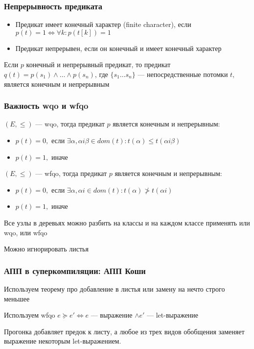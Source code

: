 \documentclass{beamer}
\def\iff{\Leftrightarrow}
\begin{document}
\begin{frame}[fragile]
  \transwipe[direction=90]
  \frametitle{Непрерывность предиката}

  \begin{itemize}
    \item Предикат имеет конечный характер (finite character), если $p(t) = 1 \iff \forall k : p(t[k]) = 1$
    \item Предикат непрерывен, если он конечный и имеет конечный характер 
  \end{itemize}

\vfill
  
  Если $p$ конечный и непрерывный предикат, то предикат $q(t) = p(s_1) \wedge \dots \wedge p(s_n)$, где $\{ s_1 \dots s_n \}$ --- непосредственные потомки $t$, является конечным и непрерывным 
\end{frame}

\begin{frame}[fragile]
  \transwipe[direction=90]
  \frametitle{Важность wqo и wfqo}
$(E, \leq)$ --- wqo, тогда предикат $p$ является конечным и непрерывным:

\begin{itemize}
  \item $p(t) = 0,$ если  $\exists \alpha, \alpha i \beta \in dom(t): t(\alpha) \leq t(\alpha i \beta)$
  \item $p(t) = 1,$ иначе
\end{itemize}

\vfill 

$(E, \leq)$ --- wfqo, тогда предикат $p$ является конечным и непрерывным:

\begin{itemize}
  \item $p(t) = 0,$ если  $\exists \alpha, \alpha i \in dom(t): t(\alpha) \ngtr t(\alpha i)$
  \item $p(t) = 1,$ иначе
\end{itemize}

\vfill 

Все узлы в деревьях можно разбить на классы и на каждом классе применять или wqo, или wfqo 

\vfill 

Можно игнорировать листья 

\end{frame}

\begin{frame}[fragile]
  \transwipe[direction=90]
  \frametitle{АПП в суперкомпиляции: АПП Коши}

  Используем теорему про добавление в листья или замену на нечто строго меньшее

  \vfill 

  Используем wfqo $e \succcurlyeq e' \iff e$ --- выражение $\wedge e'$ --- let-выражение 

  \vfill 

  Прогонка добавляет предок к листу, а любое из трех видов обобщения заменяет выражение некоторым let-выражением. 
\end{frame}
\end{document}
